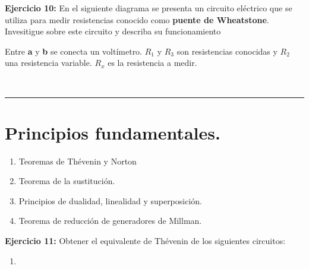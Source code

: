 \documentclass[11pt]{article}
\providecommand{\tightlist}{%
      \setlength{\itemsep}{0pt}\setlength{\parskip}{0pt}}
\begin{document}
    \textbf{Ejercicio 10:} En el siguiente diagrama se presenta un circuito
eléctrico que se utiliza para medir resistencias conocido como
\textbf{puente de Wheatstone}. Invesitigue sobre este circuito y
describa su funcionamiento

Entre \textbf{a} y \textbf{b} se conecta un voltímetro. \(R_{1}\) y
\(R_{3}\) son resistencias conocidas y \(R_{2}\) una resistencia
variable. \(R_{x}\) es la resistencia a medir.

    \begin{center}
    \end{center}
    { \hspace*{\fill} \\}
    
    \begin{center}\rule{0.5\linewidth}{0.5pt}\end{center}

\hypertarget{principios-fundamentales.}{%
\section{Principios fundamentales.}\label{principios-fundamentales.}}

\begin{enumerate}
\def\labelenumi{\arabic{enumi}.}
\tightlist
\item
  Teoremas de Thévenin y Norton
\item
  Teorema de la sustitución.
\item
  Principios de dualidad, linealidad y superposición.
\item
  Teorema de reducción de generadores de Millman.
\end{enumerate}

    \textbf{Ejercicio 11:} Obtener el equivalente de Thévenin de los
siguientes circuitos:

\begin{enumerate}
\def\labelenumi{\alph{enumi})}
\tightlist
\item
\end{enumerate}

    \begin{center}
    \end{center}
    { \hspace*{\fill} \\}
    
\end{document}

